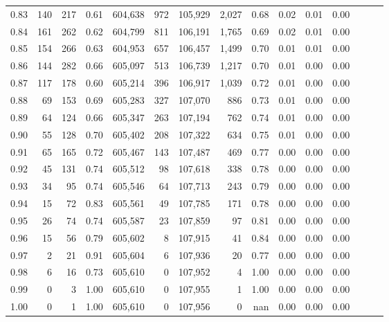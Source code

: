 \begin{tabular}{rrrrrrrrrrrrrrr}
0.83 &     140 &    217 &  0.61 &  604,638 &      972 &  105,929 &    2,027 &  0.68 &  0.02 &  0.01 &      0.00 \\
0.84 &     161 &    262 &  0.62 &  604,799 &      811 &  106,191 &    1,765 &  0.69 &  0.02 &  0.01 &      0.00 \\
0.85 &     154 &    266 &  0.63 &  604,953 &      657 &  106,457 &    1,499 &  0.70 &  0.01 &  0.01 &      0.00 \\
0.86 &     144 &    282 &  0.66 &  605,097 &      513 &  106,739 &    1,217 &  0.70 &  0.01 &  0.00 &      0.00 \\
0.87 &     117 &    178 &  0.60 &  605,214 &      396 &  106,917 &    1,039 &  0.72 &  0.01 &  0.00 &      0.00 \\
0.88 &      69 &    153 &  0.69 &  605,283 &      327 &  107,070 &      886 &  0.73 &  0.01 &  0.00 &      0.00 \\
0.89 &      64 &    124 &  0.66 &  605,347 &      263 &  107,194 &      762 &  0.74 &  0.01 &  0.00 &      0.00 \\
0.90 &      55 &    128 &  0.70 &  605,402 &      208 &  107,322 &      634 &  0.75 &  0.01 &  0.00 &      0.00 \\
0.91 &      65 &    165 &  0.72 &  605,467 &      143 &  107,487 &      469 &  0.77 &  0.00 &  0.00 &      0.00 \\
0.92 &      45 &    131 &  0.74 &  605,512 &       98 &  107,618 &      338 &  0.78 &  0.00 &  0.00 &      0.00 \\
0.93 &      34 &     95 &  0.74 &  605,546 &       64 &  107,713 &      243 &  0.79 &  0.00 &  0.00 &      0.00 \\
0.94 &      15 &     72 &  0.83 &  605,561 &       49 &  107,785 &      171 &  0.78 &  0.00 &  0.00 &      0.00 \\
0.95 &      26 &     74 &  0.74 &  605,587 &       23 &  107,859 &       97 &  0.81 &  0.00 &  0.00 &      0.00 \\
0.96 &      15 &     56 &  0.79 &  605,602 &        8 &  107,915 &       41 &  0.84 &  0.00 &  0.00 &      0.00 \\
0.97 &       2 &     21 &  0.91 &  605,604 &        6 &  107,936 &       20 &  0.77 &  0.00 &  0.00 &      0.00 \\
0.98 &       6 &     16 &  0.73 &  605,610 &        0 &  107,952 &        4 &  1.00 &  0.00 &  0.00 &      0.00 \\
0.99 &       0 &      3 &  1.00 &  605,610 &        0 &  107,955 &        1 &  1.00 &  0.00 &  0.00 &      0.00 \\
1.00 &       0 &      1 &  1.00 &  605,610 &        0 &  107,956 &        0 &   nan &  0.00 &  0.00 &      0.00 \\
\bottomrule
\end{tabular}
